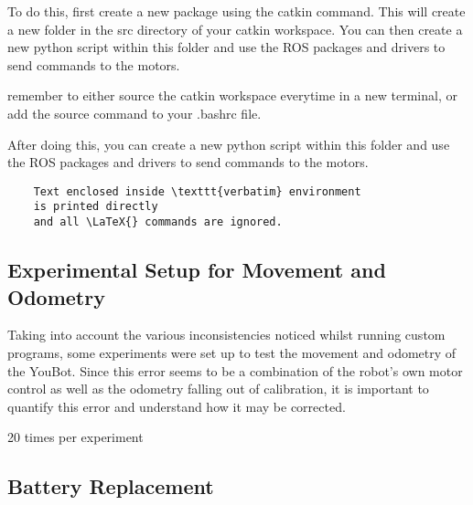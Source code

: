 \documentclass[a4paper, 12pt]{article}
\newif\ifshownotes
\newcommand{\notes}[1]{\ifshownotes\textcolor{blue}{#1}\fi}
\begin{document}
    To do this, first create a new package using the catkin command. This will create a new folder in the src directory of your catkin workspace. You can then create a new python script within this folder and use the ROS packages and drivers to send commands to the motors.

    remember to either source the catkin workspace everytime in a new terminal, or add the source command to your .bashrc file.

    After doing this, you can create a new python script within this folder and use the ROS packages and drivers to send commands to the motors. 

    

    \begin{verbatim}
    Text enclosed inside \texttt{verbatim} environment 
    is printed directly 
    and all \LaTeX{} commands are ignored.
    \end{verbatim}


   
    \pagebreak

    \subsection{Experimental Setup for Movement and Odometry}

    \notes{here, ill discuss the experimental setup for testing movement and odometry.  this should include the two experiments of moving linearly and rotating, and discuss how error is calculated. probably discuss negative feedback and PID control as well, random, percentage, consistent error, etc.}

    Taking into account the various inconsistencies noticed whilst running custom programs, some experiments were set up to test the movement and odometry of the YouBot. Since this error seems to be a combination of the robot's own motor control as well as the odometry falling out of calibration, it is important to quantify this error and understand how it may be corrected. 



    \notes{different speeds? proportional or fixed error? does the odometry also drift?}

    20 times per experiment
    
    
    \pagebreak



    \subsection{Battery Replacement}
\end{document}
